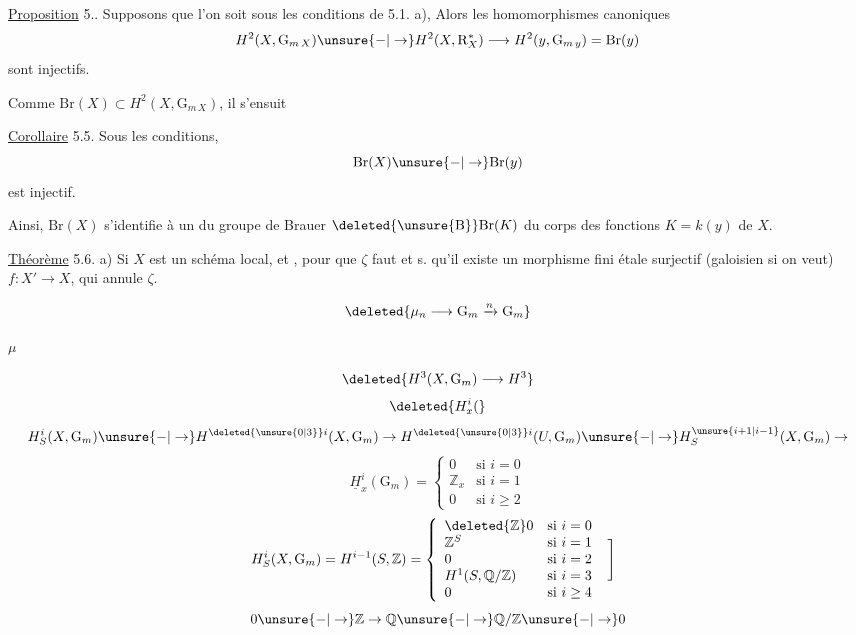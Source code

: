 \uline{Proposition} 5.. Supposons que l'on soit sous les conditions de 5.1. a),  Alors les homomorphismes canoniques
\[
H^2(X,\mathrm{G}_{m\,X})\unsure{-|\to}H^2(X,\mathrm{R}_X^*)\longrightarrow H^2(y,\mathrm{G}_{m\,y})=\mathrm{Br}(y)
\]
sont injectifs.

Comme $\mathrm{Br}(X)\subset H^2(X,\mathrm{G}_{m\,X})$, il s'ensuit

\uline{Corollaire} 5.5. Sous les  conditions,
\[
\mathrm{Br}(X)\unsure{-|\to}\mathrm{Br}(y)
\]
est injectif.

Ainsi, $\mathrm{Br}(X)$ s'identifie  à un  du groupe de Brauer $\deleted{\unsure{\mathrm{B}}}\mathrm{Br}(K)$ du corps des fonctions $K=k(y)$ de $X$.

\uline{Théorème} 5.6.  a) Si $X$ est un schéma local, et , pour que $\zeta$   faut et s. qu'il existe un  morphisme fini étale surjectif (galoisien si on veut) $f\colon X'\to X$,  qui  annule $\zeta$.


\[
\deleted{\mu_n\longrightarrow\mathrm{G}_m\xrightarrow{n}\mathrm{G}_m}
\]

$\mu$

\[
\deleted{H^3(X,\mathrm{G}_m)\longrightarrow H^3}
\]
\[
\deleted{H_x^i(}
\]
\[
H^i_S(X,\mathrm{G}_m)\unsure{-|\to}H^{\deleted{\unsure{0|3}}i}(X,\mathrm{G}_m)\to H^{\deleted{\unsure{0|3}}i}(U,\mathrm{G}_m)\unsure{-|\to}H^{\unsure{i+1|i-1}}_S(X,\mathrm{G}_m)\to
\]
\[
\underline{H}^i_x(\mathrm{G}_m)=
\begin{cases}
0&\text{si }i=0\\
\mathbb{Z}_x&\text{si }i=1\\
0&\text{si }i\geq2
\end{cases}
\]
\[
H^i_S(X,\mathrm{G}_m)=H^{i-1}(S,\mathbb{Z})=
\left\{\begin{array}{lll}
\deleted{\mathbb{Z}}0&\text{si }i=0\\
\mathbb{Z}^S&\text{si }i=1\\
0&\text{si }i=2&\smash{\left.\rule[-2.3ex]{0pt}{6.5ex}\right]}\\
H^1(S,\mathbb{Q}/\mathbb{Z})&\text{si }i=3\\
0&\text{si }i\geq4
\end{array}\right.

\]
\[
0\unsure{-|\to}\mathbb{Z}\to\mathbb{Q}\unsure{-|\to}\mathbb{Q}/\mathbb{Z}\unsure{-|\to}0
\]

